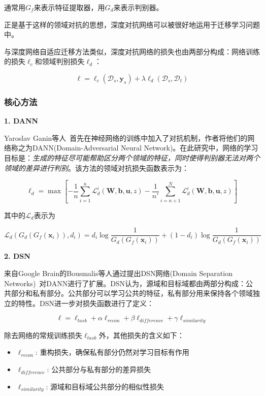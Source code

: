 通常用$G_f$来表示特征提取器，用$G_d$来表示判别器。

正是基于这样的领域对抗的思想，深度对抗网络可以被很好地运用于迁移学习问题中。

与深度网络自适应迁移方法类似，深度对抗网络的损失也由两部分构成：网络训练的损失$\ell_c$和领域判别损失$\ell_d$：

\begin{equation}
	\ell = \ell_c(\mathcal{D}_s,\mathbf{y}_s) + \lambda \ell_d(\mathcal{D}_s,\mathcal{D}_t)
\end{equation}

\subsubsection{核心方法}

\textbf{1. DANN}

Yaroslav Ganin等人~\cite{ganin2016domain}首先在神经网络的训练中加入了对抗机制，作者将他们的网络称之为DANN(Domain-Adversarial Neural Network)。在此研究中，网络的学习目标是：\textit{生成的特征尽可能帮助区分两个领域的特征，同时使得判别器无法对两个领域的差异进行判别}。该方法的领域对抗损失函数表示为：

\begin{equation}
	\ell_d = \max \left[-\frac{1}{n} \sum_{i=1}^{n} \mathcal{L}^i_d(\mathbf{W},\mathbf{b},\mathbf{u},z) - \frac{1}{n'} \sum_{i=n+1}^{N} \mathcal{L}^i_d(\mathbf{W},\mathbf{b},\mathbf{u},z)\right]
\end{equation}

其中的$\mathcal{L}_d$表示为

\begin{equation}
	\mathcal{L}_d(G_d(G_f(\mathbf{x}_i)),d_i) = d_i \log \frac{1}{G_d(G_f(\mathbf{x}_i))} + (1 - d_i) \log \frac{1}{G_d(G_f(\mathbf{x}_i))}
\end{equation}

\textbf{2. DSN}

来自Google Brain的Bousmalis等人通过提出DSN网络(Domain Separation Networks)~\cite{bousmalis2016domain}对DANN进行了扩展。DSN认为，源域和目标域都由两部分构成：公共部分和私有部分。公共部分可以学习公共的特征，私有部分用来保持各个领域独立的特性。DSN进一步对损失函数进行了定义：

\begin{equation}
	\ell = \ell_{task} + \alpha \ell_{recon} + \beta \ell_{difference} + \gamma \ell_{similarity}
\end{equation}

除去网络的常规训练损失$\ell_{task}$外，其他损失的含义如下：
\begin{itemize}
	\item $\ell_{recon}$: 重构损失，确保私有部分仍然对学习目标有作用
	\item $\ell_{difference}$: 公共部分与私有部分的差异损失
	\item $\ell_{similarity}$: 源域和目标域公共部分的相似性损失
\end{itemize}


